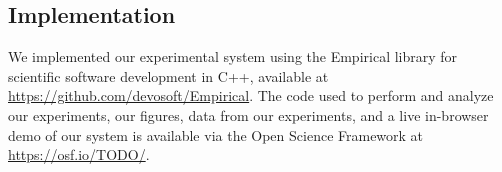 \subsection{Implementation}

We implemented our experimental system using the Empirical library for scientific software development in C++, available at \url{https://github.com/devosoft/Empirical}.
The code used to perform and analyze our experiments, our figures, data from our experiments, and a live in-browser demo of our system is available via the Open Science Framework at \url{https://osf.io/TODO/}.
